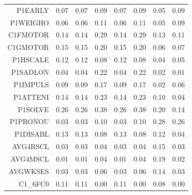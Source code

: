 \documentclass[oupdraft]{bio}
\begin{document}
\begin{center}
\begin{longtable}{r|c|c|c|c|c|c|c}
  P1EARLY & 0.07 & 0.07 & 0.09 & 0.07 & 0.09 & 0.05 & 0.09 \\ 
  P1WEIGHO & 0.06 & 0.06 & 0.11 & 0.06 & 0.11 & 0.05 & 0.09 \\ 
  C1FMOTOR & 0.14 & 0.14 & \cellcolor[gray]{.9}0.29 & 0.14 & \cellcolor[gray]{.9}0.29 & 0.13 & 0.11 \\ 
  C1GMOTOR & 0.15 & 0.15 & \cellcolor[gray]{.9}0.20 & 0.15 & \cellcolor[gray]{.9}0.20 & 0.06 & 0.07 \\ 
  P1HSCALE & 0.12 & 0.12 & 0.08 & 0.12 & 0.08 & 0.04 & 0.05 \\ 
  P1SADLON & 0.04 & 0.04 & \cellcolor[gray]{.9}0.22 & 0.04 & \cellcolor[gray]{.9}0.22 & 0.02 & 0.01 \\ 
  P1IMPULS & 0.09 & 0.09 & 0.17 & 0.09 & 0.17 & 0.02 & 0.06 \\ 
  P1ATTENI & 0.14 & 0.14 & \cellcolor[gray]{.9}0.23 & 0.14 & \cellcolor[gray]{.9}0.23 & 0.10 & 0.04 \\ 
  P1SOLVE & \cellcolor[gray]{.9}0.26 & \cellcolor[gray]{.9}0.26 & \cellcolor[gray]{.9}0.38 & \cellcolor[gray]{.9}0.26 & \cellcolor[gray]{.9}0.38 & \cellcolor[gray]{.9}0.20 & 0.14 \\ 
  P1PRONOU & 0.03 & 0.03 & 0.10 & 0.03 & 0.10 & \cellcolor[gray]{.9}0.28 & \cellcolor[gray]{.9}0.26 \\ 
  P1DISABL & 0.13 & 0.13 & 0.08 & 0.13 & 0.08 & 0.12 & 0.04 \\ 
  AVG4RSCL & 0.03 & 0.03 & 0.04 & 0.03 & 0.04 & 0.15 & 0.03 \\ 
  AVG4MSCL & 0.01 & 0.01 & 0.04 & 0.01 & 0.04 & 0.19 & 0.02 \\ 
  AVGWKSES & 0.03 & 0.03 & 0.06 & 0.03 & 0.06 & 0.14 & 0.03 \\ 
  C1\_6FC0 & 0.11 & 0.11 & 0.00 & 0.11 & 0.00 & 0.08 & 0.00 \\ 
\end{longtable}
\end{center}
\end{document}
